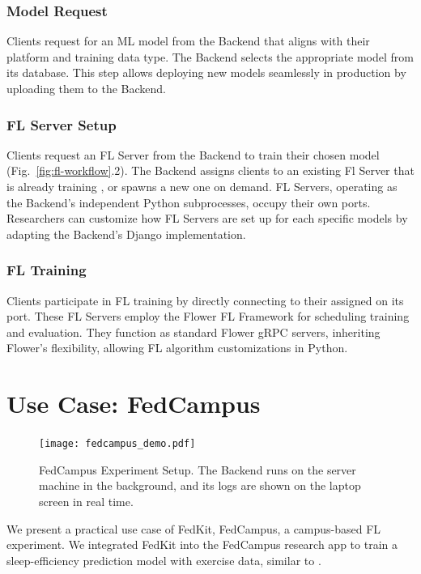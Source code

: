 \documentclass[letterpaper]{article} %
\begin{document}
\subsubsection{Model Request}
Clients request for an ML model from the Backend that
aligns with their platform and training data type.
The Backend selects the appropriate model \model{} from its database.
This step allows deploying new models seamlessly
in production by uploading them to the Backend.

\subsubsection{FL Server Setup}
Clients request an FL Server from the Backend to
train their chosen model \model{}
(Fig.~\ref{fig:fl-workflow}.2).
The Backend assigns clients to an existing Fl Server \fs{} that
is already training \model{},
or spawns a new one on demand.
FL Servers, operating as the Backend's independent Python subprocesses,
occupy their own ports.
Researchers can customize how FL Servers are set up for each specific models by
adapting the Backend's Django implementation.

\subsubsection{FL Training}
Clients participate in FL training by directly connecting to
their assigned \fs{} on its port.
These FL Servers employ the Flower FL Framework for
scheduling training and evaluation.
They function as standard Flower gRPC servers,
inheriting Flower's flexibility,
allowing FL algorithm customizations in Python.

\section{Use Case: FedCampus}

\begin{figure}
    \centering
    \texttt{[image: fedcampus\_demo.pdf]}
    \caption{FedCampus Experiment Setup.
        The Backend runs on the server machine in the background,
        and its logs are shown on the laptop screen in real time.}
    \label{fig:fedcampus}
\end{figure}

We present a practical use case of FedKit, FedCampus,
a campus-based FL experiment.
We integrated FedKit into the FedCampus research app to
train a sleep-efficiency prediction model with exercise data,
similar to \cite{khoa2022fedmcrnn}.
\end{document}
